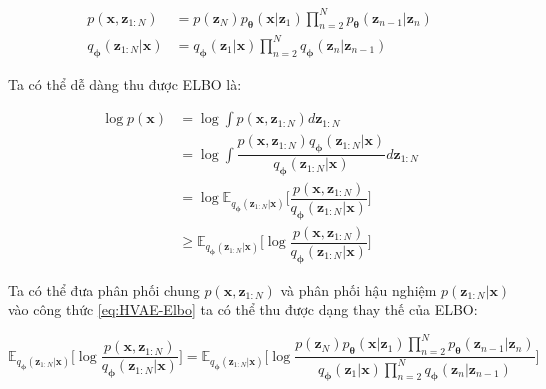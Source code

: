 \documentclass[14pt, a4paper]{article}
\numberwithin{equation}{section}
\numberwithin{figure}{section}
\numberwithin{dl}{section}
\numberwithin{md}{section}
\numberwithin{bd}{section}
\numberwithin{dn}{section}
\numberwithin{hq}{section}
\begin{document}
    \begin{equation} \label{eq:HVAE-Formulation}
        \begin{aligned}
            p(\boldsymbol{x}, \boldsymbol{z}_{1:N})&=p(\boldsymbol{z}_N) p_{\boldsymbol{\theta}} (\boldsymbol{x} \vert \boldsymbol{z}_1) \prod_{n=2}^N p_{\boldsymbol{\theta}} (\boldsymbol{z}_{n-1} \vert \boldsymbol{z}_n) \\
            q_{\boldsymbol{\phi}} (\boldsymbol{z}_{1:N} \vert \boldsymbol{x}) &= q_{\boldsymbol{\phi}} (\boldsymbol{z}_1 \vert \boldsymbol{x}) \prod_{n=2}^N q_{\boldsymbol{\phi}} (\boldsymbol{z}_n \vert \boldsymbol{z}_{n-1})
        \end{aligned}
    \end{equation}

    Ta có thể dễ dàng thu được ELBO là:

    \begin{equation} \label{eq:HVAE-Elbo}
        \begin{aligned}
            \log p(\boldsymbol{x}) &= \log \int p(\boldsymbol{x}, \boldsymbol{z}_{1:N}) d \boldsymbol{z}_{1:N} \\
            &= \log \int \dfrac{p(\boldsymbol{x}, \boldsymbol{z}_{1:N}) q_{\boldsymbol{\phi}} (\boldsymbol{z}_{1:N} \vert \boldsymbol{x})}{q_{\boldsymbol{\phi}} (\boldsymbol{z}_{1:N} \vert \boldsymbol{x})} d \boldsymbol{z}_{1:N} \\
            &= \log \mathbb{E}_{q_{\boldsymbol{\phi}} (\boldsymbol{z}_{1:N} \vert \boldsymbol{x})} \Bigg \lbrack \dfrac{p(\boldsymbol{x}, \boldsymbol{z}_{1:N})}{q_{\boldsymbol{\phi}} (\boldsymbol{z}_{1:N} \vert \boldsymbol{x})} \Bigg \rbrack \\
            & \geq \mathbb{E}_{q_{\boldsymbol{\phi}} (\boldsymbol{z}_{1:N} \vert \boldsymbol{x})} \Bigg \lbrack \log \dfrac{p(\boldsymbol{x}, \boldsymbol{z}_{1:N})}{q_{\boldsymbol{\phi}} (\boldsymbol{z}_{1:N} \vert \boldsymbol{x})}  \Bigg \rbrack
        \end{aligned}
    \end{equation}

    Ta có thể đưa phân phối chung $p(\boldsymbol{x}, \boldsymbol{z}_{1:N})$ và phân phối hậu nghiệm $p(\boldsymbol{z}_{1:N} \vert \boldsymbol{x})$ vào công thức \ref{eq:HVAE-Elbo} ta có thể thu được dạng thay thế của ELBO:

    \begin{equation}
        \mathbb{E}_{q_{\boldsymbol{\phi}} (\boldsymbol{z}_{1:N} \vert \boldsymbol{x})} \Bigg \lbrack \log \dfrac{p(\boldsymbol{x}, \boldsymbol{z}_{1:N})}{q_{\boldsymbol{\phi}} (\boldsymbol{z}_{1:N} \vert \boldsymbol{x})}  \Bigg \rbrack = \mathbb{E}_{q_{\boldsymbol{\phi}} (\boldsymbol{z}_{1:N} \vert \boldsymbol{x})} \Bigg \lbrack \log \dfrac{p(\boldsymbol{z}_N) p_{\boldsymbol{\theta}} (\boldsymbol{x} \vert \boldsymbol{z}_1) \prod_{n=2}^N p_{\boldsymbol{\theta}} (\boldsymbol{z}_{n-1} \vert \boldsymbol{z}_n)}{q_{\boldsymbol{\phi}} (\boldsymbol{z}_1 \vert \boldsymbol{x}) \prod_{n=2}^N q_{\boldsymbol{\phi}} (\boldsymbol{z}_n \vert \boldsymbol{z}_{n-1})} \Bigg \rbrack
    \end{equation}
\end{document}
